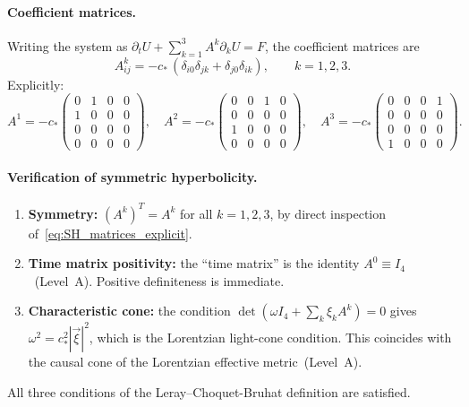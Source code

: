 \documentclass[11pt,a4paper]{article}
\numberwithin{equation}{section}
\begin{document}
\paragraph{Coefficient matrices.}
Writing the system as $\partial_t U + \sum_{k=1}^{3} A^k\partial_k U = F$,
the coefficient matrices are
\begin{equation}
  A^k_{ij} = -c_*\,(\delta_{i0}\delta_{jk} + \delta_{j0}\delta_{ik}),
  \qquad k=1,2,3.
  \label{eq:SH_Amatrices}
\end{equation}
Explicitly:
\begin{equation}
  A^1 = -c_*\!\begin{pmatrix}
    0 & 1 & 0 & 0 \\
    1 & 0 & 0 & 0 \\
    0 & 0 & 0 & 0 \\
    0 & 0 & 0 & 0
  \end{pmatrix},\quad
  A^2 = -c_*\!\begin{pmatrix}
    0 & 0 & 1 & 0 \\
    0 & 0 & 0 & 0 \\
    1 & 0 & 0 & 0 \\
    0 & 0 & 0 & 0
  \end{pmatrix},\quad
  A^3 = -c_*\!\begin{pmatrix}
    0 & 0 & 0 & 1 \\
    0 & 0 & 0 & 0 \\
    0 & 0 & 0 & 0 \\
    1 & 0 & 0 & 0
  \end{pmatrix}.
  \label{eq:SH_matrices_explicit}
\end{equation}

\paragraph{Verification of symmetric hyperbolicity.}
\begin{enumerate}
  \item \textbf{Symmetry:} $(A^k)^T = A^k$ for all $k=1,2,3$, by direct
    inspection of~\eqref{eq:SH_matrices_explicit}.
  \item \textbf{Time matrix positivity:} the ``time matrix'' is the
    identity $A^0 \equiv I_4$~(Level~A).
    Positive definiteness is immediate.
  \item \textbf{Characteristic cone:} the condition
    $\det(\omega I_4 + \sum_k \xi_k A^k)=0$ gives
    $\omega^2 = c_*^2|\vec\xi|^2$,
    which is the Lorentzian light-cone condition.
    This coincides with the causal cone of the Lorentzian effective
    metric~(Level~A).
\end{enumerate}
All three conditions of the Leray--Choquet-Bruhat definition are
satisfied.
\end{document}
